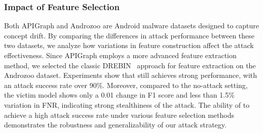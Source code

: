 
\subsubsection{Impact of Feature Selection}
\label{Impact of Feature Selection}
Both APIGraph and Androzoo are Android malware datasets designed to capture concept drift. By comparing the differences in attack performance between these two datasets, we analyze how variations in feature construction affect the attack effectiveness.
Since APIGraph employs a more advanced feature extraction method, we selected the classic DREBIN~\cite{2014-NDSS-drebin} approach for feature extraction on the Androzoo dataset.
Experiments show that \pandora still achieves strong performance, with an attack success rate over 90\%.
Moreover, compared to the no-attack setting, the victim model shows only a 0.01 change in F1 score and less than 1.5\% variation in FNR, indicating strong stealthiness of the attack.
The ability of \pandora to achieve a high attack success rate under various feature selection methods demonstrates the robustness and generalizability of our attack strategy.

